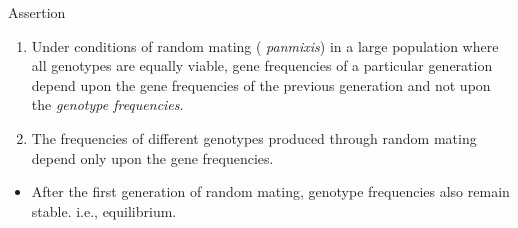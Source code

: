 \documentclass[11pt,dvipsnames,ignorenonframetext,aspectratio=169]{beamer}
\providecommand{\tightlist}{%
  \setlength{\itemsep}{0pt}\setlength{\parskip}{0pt}}
\begin{document}
\begin{frame}{Assertion}
\protect\hypertarget{assertion}{}
\begin{enumerate}
\tightlist
\item
  Under conditions of random mating ( \emph{panmixis}) in a large
  population where all genotypes are equally viable, gene frequencies of
  a particular generation depend upon the gene frequencies of the
  previous generation and not upon the \emph{genotype frequencies}.
\item
  The frequencies of different genotypes produced through random mating
  depend only upon the gene frequencies.
\end{enumerate}

\begin{itemize}
\tightlist
\item
  After the first generation of random mating, genotype frequencies also
  remain stable. i.e., equilibrium.
\end{itemize}
\end{frame}
\end{document}
